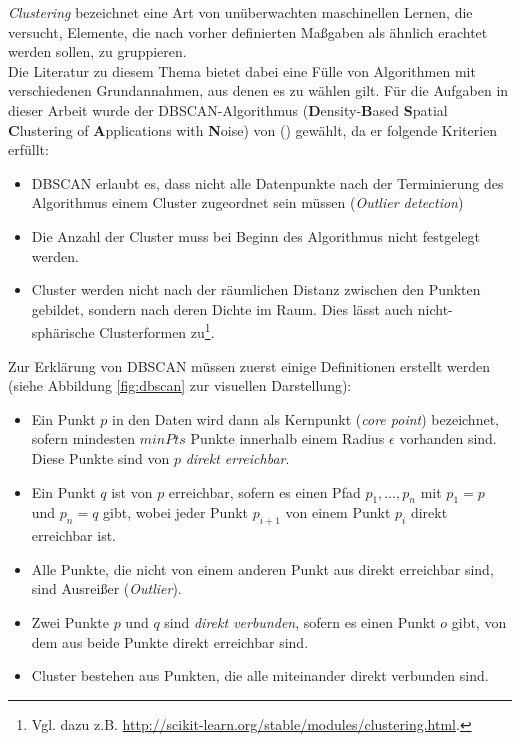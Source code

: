 \emph{Clustering} bezeichnet eine Art von unüberwachten maschinellen Lernen,
die versucht, Elemente, die nach vorher definierten Maßgaben als ähnlich erachtet
werden sollen, zu gruppieren.\\
Die Literatur zu diesem Thema bietet dabei eine Fülle von Algorithmen mit verschiedenen
Grundannahmen, aus denen es zu wählen gilt. Für die Aufgaben in dieser Arbeit wurde
der DBSCAN-Algorithmus (\textbf{D}ensity-\textbf{B}ased \textbf{S}patial \textbf{C}lustering of
\textbf{A}pplications with \textbf{N}oise) von (\cite{ester1996density}) gewählt, da er folgende Kriterien erfüllt:
\begin{itemize}
  \item DBSCAN erlaubt es, dass nicht alle Datenpunkte nach der
  Terminierung des Algorithmus einem Cluster zugeordnet sein müssen (\emph{Outlier detection})
  \item Die Anzahl der Cluster muss bei Beginn des Algorithmus nicht festgelegt werden.
  \item Cluster werden nicht nach der räumlichen Distanz zwischen den Punkten gebildet, sondern nach deren
  Dichte im Raum. Dies lässt auch nicht-sphärische Clusterformen zu\footnote{Vgl. dazu z.B. \url{http://scikit-learn.org/stable/modules/clustering.html}.}.
\end{itemize}

Zur Erklärung von DBSCAN müssen zuerst einige Definitionen erstellt werden (siehe Abbildung \ref{fig:dbscan} zur visuellen
Darstellung):
\begin{itemize}
  \item Ein Punkt $p$ in den Daten wird dann als
  Kernpunkt (\emph{core point}) bezeichnet, sofern mindesten $minPts$ Punkte innerhalb einem Radius $\epsilon$ vorhanden sind.\\
  Diese Punkte sind von $p$ \emph{direkt erreichbar}.
  \item Ein Punkt $q$ ist von $p$ erreichbar, sofern es einen Pfad $p_1, \ldots, p_n$ mit $p_1 = p$ und $p_n = q$ gibt, wobei
  jeder Punkt $p_{i+1}$ von einem Punkt $p_i$ direkt erreichbar ist.
  \item Alle Punkte, die nicht von einem anderen Punkt aus direkt erreichbar sind, sind Ausreißer (\emph{Outlier}).
  \item Zwei Punkte $p$ und $q$ sind \emph{direkt verbunden}, sofern es einen Punkt $o$ gibt,
  von dem aus beide Punkte direkt erreichbar sind.
  \item Cluster bestehen aus Punkten, die alle miteinander direkt verbunden sind.
\end{itemize}

